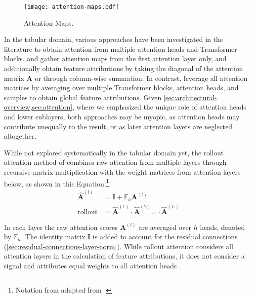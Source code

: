 \begin{figure}[ht]
    \centering
    \texttt{[image: attention-maps.pdf]}
    \caption[Attention Maps]{Attention Maps.}
    \label{fig:attention-maps}
\end{figure}

In the tabular domain, various approaches have been investigated in the literature to obtain attention from multiple attention heads and Transformer blocks. \textcite[][18]{somepalliSaintImprovedNeural2021} and \textcite[][11]{borisovDeepNeuralNetworks2022} gather attention maps from the first attention layer only, and \textcite[][11]{borisovDeepNeuralNetworks2022} additionally obtain feature attributions by taking the diagonal of the attention matrix $\mathbf{A}$ or through column-wise summation. In contrast, \textcite[][10]{gorishniyRevisitingDeepLearning2021} leverage all attention matrices by averaging over multiple Transformer blocks, attention heads, and samples to obtain global feature attributions. Given \cref{sec:architectural-overview,sec:attention}, where we emphasized the unique role of attention heads and lower sublayers, both approaches may be myopic, as attention heads may contribute unequally to the result, or as later attention layers are neglected altogether.

While not explored systematically in the tabular domain yet, the rollout attention method of \textcite[][3]{abnarQuantifyingAttentionFlow2020} combines raw attention from multiple layers through recursive matrix multiplication with the weight matrices from attention layers below, as shown in this Equation:\footnote{Notation from adapted from \textcite[][786]{cheferTransformerInterpretabilityAttention2021}.}
\begin{equation}
    \begin{aligned}
        \hat{\mathbf{A}}^{(l)}    & =\mathbf{I}+\mathbb{E}_h \mathbf{A}^{(l)}                                              \\
        \operatorname { rollout } & =\hat{\mathbf{A}}^{(1)} \cdot \hat{\mathbf{A}}^{(2)} \ldots\cdot\hat{\mathbf{A}}^{(L)}
    \end{aligned}
    \label{eq:attention-map-rollout}
\end{equation}

In each layer the raw attention scores $\mathbf{A}^{(l)}$ are averaged over $h$ heads, denoted by $\mathbb{E}_h$. The identity matrix $\mathbf{I}$ is added to account for the residual connections (\cref{sec:residual-connections-layer-norm}). While rollout attention considers all attention layers in the calculation of feature attributions, it does not consider a signal and attributes equal weights to all attention heads \autocite[][786]{cheferTransformerInterpretabilityAttention2021}.

